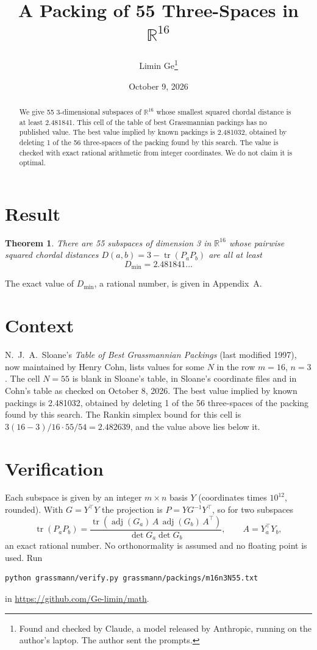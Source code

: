 \documentclass[11pt,a4paper]{article}
\title{A Packing of 55 Three-Spaces in $\mathbb{R}^{16}$}
\author{Limin Ge\thanks{Found and checked by Claude, a model released by Anthropic, running on the author's laptop. The author sent the prompts.}}
\date{October 9, 2026}
\newtheorem*{theorem}{Theorem}
\begin{document}
\maketitle
\begin{abstract}
We give 55 3-dimensional subspaces of $\mathbb{R}^{16}$ whose smallest squared chordal distance is at least 2.481841. This cell of the table of best Grassmannian packings has no published value. The best value implied by known packings is 2.481032, obtained by deleting 1 of the 56 three-spaces of the packing found by this search. The value is checked with exact rational arithmetic from integer coordinates. We do not claim it is optimal.
\end{abstract}

\section{Result}
\begin{theorem}
There are 55 subspaces of dimension 3 in $\mathbb{R}^{16}$ whose pairwise squared chordal distances $D(a,b) = 3 - \operatorname{tr}(P_aP_b)$ are all at least
\[ D_{\min} = 2.481841\ldots \]
\end{theorem}
The exact value of $D_{\min}$, a rational number, is given in Appendix~A.


\section{Context}
N.~J.~A.~Sloane's \emph{Table of Best Grassmannian Packings} (last modified 1997), now maintained by Henry Cohn, lists values for some $N$ in the row $m=16$, $n=3$. The cell $N=55$ is blank in Sloane's table, in Sloane's coordinate files and in Cohn's table as checked on October 8, 2026. The best value implied by known packings is 2.481032, obtained by deleting 1 of the 56 three-spaces of the packing found by this search. The Rankin simplex bound for this cell is $3(16-3)/16\cdot 55/54 = 2.482639$, and the value above lies below it.


\section{Verification}
Each subspace is given by an integer $m\times n$ basis $Y$ (coordinates times $10^{12}$, rounded). With $G=Y^\top Y$ the projection is $P=YG^{-1}Y^\top$, so for two subspaces
\[ \operatorname{tr}(P_aP_b)=\frac{\operatorname{tr}(\operatorname{adj}(G_a)\,A\,\operatorname{adj}(G_b)\,A^\top)}{\det G_a\det G_b},\qquad A=Y_a^\top Y_b, \]
an exact rational number. No orthonormality is assumed and no floating point is used. Run
\begin{verbatim}
python grassmann/verify.py grassmann/packings/m16n3N55.txt
\end{verbatim}
in \url{https://github.com/Ge-limin/math}.
\end{document}
